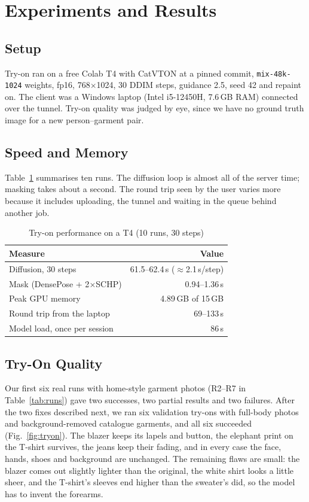 \documentclass{article}
\begin{document}
\section{Experiments and Results}
\label{sec:exp}

\subsection{Setup}

Try-on ran on a free Colab T4 with CatVTON at a pinned commit, \texttt{mix-48k-1024} weights, fp16,
768$\times$1024, 30 DDIM steps, guidance 2.5, seed 42 and repaint on. The client was a Windows laptop
(Intel i5-12450H, 7.6\,GB RAM) connected over the tunnel. Try-on quality was judged by eye, since we
have no ground truth image for a new person--garment pair.

\subsection{Speed and Memory}

Table~\ref{tab:perf} summarises ten runs. The diffusion loop is almost all of the server time; masking
takes about a second. The round trip seen by the user varies more because it includes uploading,
the tunnel and waiting in the queue behind another job.

\begin{table}[t]
\caption{Try-on performance on a T4 (10 runs, 30 steps)}
\label{tab:perf}
\centering
\begin{tabular}{@{}lr@{}}
\toprule
Measure & Value\\
\midrule
Diffusion, 30 steps & 61.5--62.4\,s ($\approx$2.1\,s/step)\\
Mask (DensePose + 2$\times$SCHP) & 0.94--1.36\,s\\
Peak GPU memory & 4.89\,GB of 15\,GB\\
Round trip from the laptop & 69--133\,s\\
Model load, once per session & 86\,s\\
\bottomrule
\end{tabular}
\end{table}

\subsection{Try-On Quality}

Our first six real runs with home-style garment photos (R2--R7 in Table~\ref{tab:runs}) gave two
successes, two partial results and two failures. After the two fixes described next, we ran six
validation try-ons with full-body photos and background-removed catalogue garments, and all six
succeeded (Fig.~\ref{fig:tryon}). The blazer keeps its lapels and button, the elephant print on the
T-shirt survives, the jeans keep their fading, and in every case the face, hands, shoes and background
are unchanged. The remaining flaws are small: the blazer comes out slightly lighter than the original,
the white shirt looks a little sheer, and the T-shirt's sleeves end higher than the sweater's did, so
the model has to invent the forearms.
\end{document}
